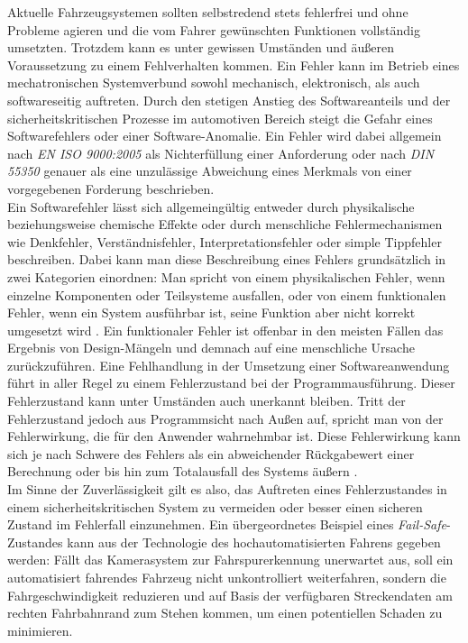 Aktuelle Fahrzeugsystemen sollten selbstredend stets fehlerfrei und ohne Probleme agieren und die vom Fahrer gewünschten Funktionen vollständig umsetzten. Trotzdem kann es unter gewissen Umständen und äußeren Voraussetzung zu einem Fehlverhalten kommen. Ein Fehler kann im Betrieb eines mechatronischen Systemverbund sowohl mechanisch, elektronisch, als auch softwareseitig auftreten. Durch den stetigen Anstieg des Softwareanteils und der sicherheitskritischen Prozesse im automotiven Bereich steigt die Gefahr eines Softwarefehlers oder einer Software-Anomalie. Ein Fehler wird dabei allgemein nach \emph{EN ISO 9000:2005} \cite{DINDeutschesInstitutfurNormunge.V..201511} als \glqq Nichterfüllung einer Anforderung\grqq{} oder nach \emph{DIN 55350} \cite{DINDeutschesInstitutfurNormunge.V..200805} genauer als \glqq eine unzulässige Abweichung eines Merkmals von einer vorgegebenen Forderung\grqq{} beschrieben. \\
Ein Softwarefehler lässt sich allgemeingültig entweder durch physikalische beziehungsweise chemische Effekte oder durch menschliche Fehlermechanismen wie Denkfehler, Verständnisfehler, Interpretationsfehler oder simple Tippfehler beschreiben. Dabei kann man diese Beschreibung eines Fehlers grundsätzlich in zwei Kategorien einordnen: Man spricht von einem physikalischen Fehler, wenn einzelne Komponenten oder Teilsysteme ausfallen, oder von einem funktionalen Fehler, wenn ein System ausführbar ist, seine Funktion aber nicht korrekt umgesetzt wird \cite{Borcsok.2007}. Ein funktionaler Fehler ist offenbar in den meisten Fällen das Ergebnis von Design-Mängeln und demnach auf eine menschliche Ursache zurückzuführen. Eine Fehlhandlung in der Umsetzung einer Softwareanwendung führt in aller Regel zu einem Fehlerzustand bei der Programmausführung. Dieser Fehlerzustand kann unter Umständen auch unerkannt bleiben. Tritt der Fehlerzustand jedoch aus Programmsicht nach Außen auf, spricht man von der Fehlerwirkung, die für den Anwender wahrnehmbar ist. Diese Fehlerwirkung kann sich je nach Schwere des Fehlers als ein abweichender Rückgabewert einer Berechnung oder bis hin zum Totalausfall des Systems äußern \cite{ISTQBAISBLGermanTestingBoarde.V.2017}. \\
Im Sinne der Zuverlässigkeit gilt es also, das Auftreten eines Fehlerzustandes in einem sicherheitskritischen System zu vermeiden oder besser einen sicheren Zustand im Fehlerfall einzunehmen. Ein übergeordnetes Beispiel eines \emph{Fail-Safe}-Zustandes kann aus der Technologie des hochautomatisierten Fahrens gegeben werden: Fällt das Kamerasystem zur Fahrspurerkennung unerwartet aus, soll ein automatisiert fahrendes Fahrzeug nicht unkontrolliert weiterfahren, sondern die Fahrgeschwindigkeit reduzieren und auf Basis der verfügbaren Streckendaten am rechten Fahrbahnrand zum Stehen kommen, um einen potentiellen Schaden zu minimieren. 

